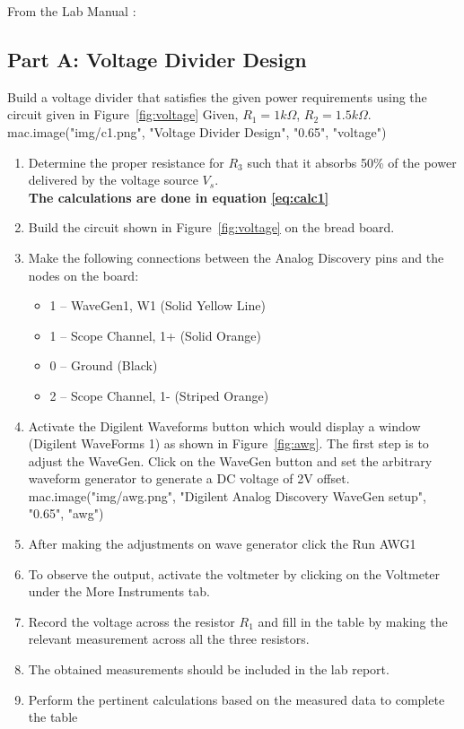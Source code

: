 {%

From the Lab Manual \cite{manual} :
\subsection{Part A: Voltage Divider Design}
\label{sub:Procedure Part A}
Build a voltage divider that satisfies the given power requirements using the circuit
given in Figure~\ref{fig:voltage}  Given, $R_1= 1 k\Omega$, $R_2 = 1.5 k\Omega$.
{{ mac.image("img/c1.png", "Voltage Divider Design", "0.65", "voltage")}}
\begin{enumerate}
  \item Determine the proper resistance for $R_3$ such that it absorbs 50\% of the power delivered by
  the voltage source $V_s$. \\
  \textbf{The calculations are done in equation \ref{eq:calc1}}
  \item Build the circuit shown in Figure~\ref{fig:voltage}  on the bread board.
  \item Make the following connections between the Analog Discovery pins and the nodes on the
  board:
  \begin{itemize}
    \item 1 – WaveGen1, W1 (Solid Yellow Line)
    \item 1 – Scope Channel, 1+ (Solid Orange)
    \item 0 – Ground (Black)
    \item 2 – Scope Channel, 1- (Striped Orange)
  \end{itemize}
  \item Activate the Digilent Waveforms button which would display a window (Digilent
  WaveForms 1) as shown in Figure~\ref{fig:awg}. The first step is to adjust the WaveGen.
  Click on the WaveGen button and set the arbitrary waveform generator to generate a DC
  voltage of 2V offset.
  {{ mac.image("img/awg.png", "Digilent Analog Discovery WaveGen setup", "0.65", "awg")}}
  \item After making the adjustments on wave generator click the Run AWG1
  \item To observe the output, activate the voltmeter by clicking on the Voltmeter under the
  More Instruments tab.
  \item Record the voltage across the resistor $R_1$ and fill in the table by making the relevant
  measurement across all the three resistors.
  \item The obtained measurements should be included in the lab report.
  \item Perform the pertinent calculations based on the measured data to complete the table
\end{enumerate}
\vspace{1cm}

}
